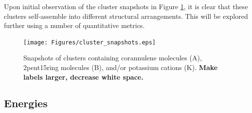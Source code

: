 
Upon initial observation of the cluster snapshots in Figure \ref{fig:clustersnapshots}, it is clear that these clusters self-assemble into different structural arrangements.  This will be explored further using a number of quantitative metrics.
%
\begin{figure}[!tbh]
\centering
\texttt{[image: Figures/cluster\_snapshots.eps]}
\caption{Snapshots of clusters containing corannulene molecules (A), 2pent15ring molecules (B), and/or potassium cations (K). \textbf{Make labels larger, decrease white space.}}
\label{fig:clustersnapshots}
\end{figure}
%

\subsection{Energies}

